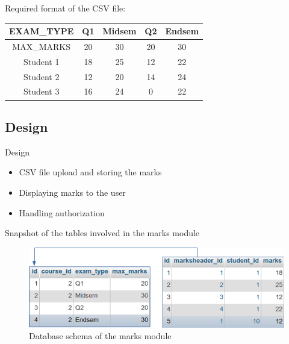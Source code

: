 \documentclass{beamer}
\begin{document}
\begin{frame}
	Required format of the CSV file: \\
	\vspace{0.4cm}
\centering
\begin{tabular}{|c|c|c|c|c|}
	\hline \rule[-2ex]{0pt}{5.5ex} EXAM\_TYPE & Q1 & Midsem & Q2 & Endsem \\ 
	\hline \rule[-2ex]{0pt}{5.5ex} MAX\_MARKS & 20 & 30 & 20 & 30 \\ 
	\hline \rule[-2ex]{0pt}{5.5ex} Student 1 & 18 & 25 & 12 & 22 \\ 
	\hline \rule[-2ex]{0pt}{5.5ex} Student 2 & 12 & 20 & 14 & 24 \\ 
	\hline \rule[-2ex]{0pt}{5.5ex} Student 3 & 16 & 24 & 0 & 22 \\ 
	\hline 
\end{tabular} 
\end{frame}

\subsection{Design}

\begin{frame}{Design}
	\begin{itemize}
		\item CSV file upload and storing the marks
		\item Displaying marks to the user
		\item Handling authorization
	\end{itemize}
\end{frame}

\begin{frame}{Snapshot of the tables involved in the marks module}
	\begin{figure}
	\centering
	\includegraphics[width=0.8\linewidth]{media/marksdb}
	\caption{Database schema of the marks module}
	\label{fig:marksdb}
	\end{figure}

\end{frame}
\end{document}
